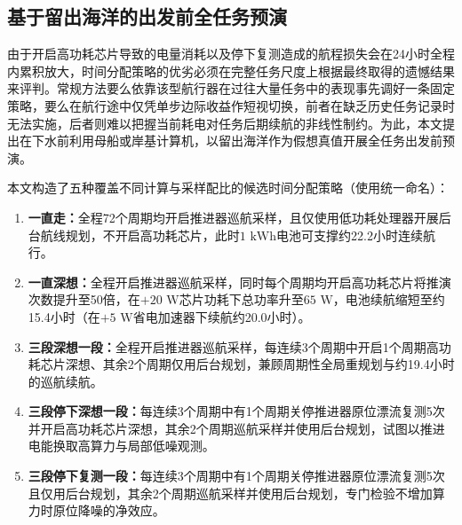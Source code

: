 \subsection{基于留出海洋的出发前全任务预演}

由于开启高功耗芯片导致的电量消耗以及停下复测造成的航程损失会在24小时全程内累积放大，时间分配策略的优劣必须在完整任务尺度上根据最终取得的遗憾结果来评判。常规方法要么依靠该型航行器在过往大量任务中的表现事先调好一条固定策略，要么在航行途中仅凭单步边际收益作短视切换，前者在缺乏历史任务记录时无法实施，后者则难以把握当前耗电对任务后期续航的非线性制约。为此，本文提出在下水前利用母船或岸基计算机，以留出海洋作为假想真值开展全任务出发前预演。

本文构造了五种覆盖不同计算与采样配比的候选时间分配策略（使用统一命名）：
\begin{enumerate}
  \item \textbf{一直走：}全程72个周期均开启推进器巡航采样，且仅使用低功耗处理器开展后台航线规划，不开启高功耗芯片，此时$1\text{ kWh}$电池可支撑约22.2小时连续航行。
  \item \textbf{一直深想：}全程开启推进器巡航采样，同时每个周期均开启高功耗芯片将推演次数提升至50倍，在$+20\text{ W}$芯片功耗下总功率升至$65\text{ W}$，电池续航缩短至约15.4小时（在$+5\text{ W}$省电加速器下续航约20.0小时）。
  \item \textbf{三段深想一段：}全程开启推进器巡航采样，每连续3个周期中开启1个周期高功耗芯片深想、其余2个周期仅用后台规划，兼顾周期性全局重规划与约19.4小时的巡航续航。
  \item \textbf{三段停下深想一段：}每连续3个周期中有1个周期关停推进器原位漂流复测5次并开启高功耗芯片深想，其余2个周期巡航采样并使用后台规划，试图以推进电能换取高算力与局部低噪观测。
  \item \textbf{三段停下复测一段：}每连续3个周期中有1个周期关停推进器原位漂流复测5次且仅用后台规划，其余2个周期巡航采样并使用后台规划，专门检验不增加算力时原位降噪的净效应。
\end{enumerate}

